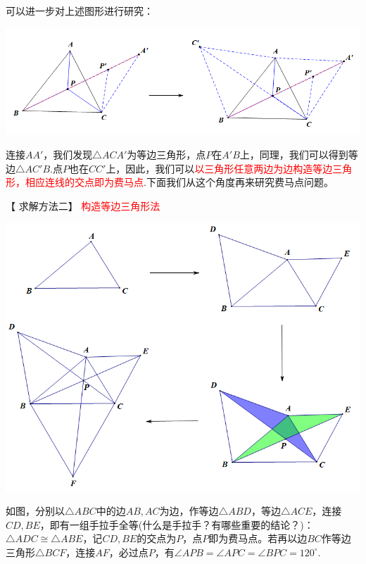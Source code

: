 \documentclass[10pt]{ctexart}
\begin{document}
可以进一步对上述图形进行研究：

\begin{center}
	\includegraphics[scale=0.6]{figure/feimadian03}
\end{center}

连接$AA'$，我们发现$\triangle ACA'$为等边三角形，点$P$在$A'B$上，同理，我们可以得到等边$\triangle AC'B$.点$P$也在$CC'$上，因此，我们可以\textcolor{red}{以三角形任意两边为边构造等边三角形，相应连线的交点即为费马点}.下面我们从这个角度再来研究费马点问题。

【 求解方法二】 \textcolor{red}{构造等边三角形法}

\begin{center}
	\includegraphics[scale=0.6]{figure/feimadian05}
\end{center}

{\kaishu\color{blue}如图，分别以$\triangle ABC$中的边$AB,AC$为边，作等边$\triangle ABD$，等边$\triangle ACE$，连接$CD,BE$，即有一组手拉手全等({\kaishu\color{red}什么是手拉手？有哪些重要的结论？})：$\triangle ADC\cong \triangle ABE$，记$CD,BE$的交点为$P$，点$P$即为费马点。若再以边$BC$作等边三角形$\triangle BCF$，连接$AF$，必过点$P$，有$\angle APB=\angle APC=\angle BPC=120^\circ$}.
\end{document}
